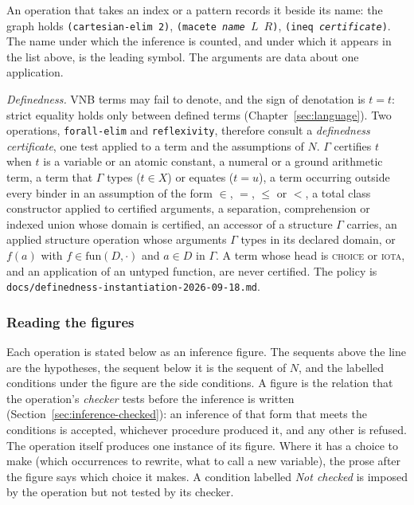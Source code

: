An operation that takes an index or a pattern records it beside its
name: the graph holds \texttt{(cartesian-elim 2)}, \texttt{(macete
\textit{name} $L$ $R$)}, \texttt{(ineq \textit{certificate})}.  The name under which the inference is counted, and under which
it appears in the list above, is the leading symbol.  The arguments are
data about one application.

\emph{Definedness.}  VNB terms may fail to denote, and the sign of
denotation is $t = t$: strict equality holds only between defined terms
(Chapter~\ref{sec:language}).  Two operations, \texttt{forall-elim}
and \texttt{reflexivity}, therefore consult a \emph{definedness
certificate}, one test applied to a term and the assumptions of $N$.
$\Gamma$ certifies $t$ when $t$ is a variable or an atomic constant, a
numeral or a ground arithmetic term, a term that $\Gamma$ types
($t \in X$) or equates ($t = u$), a term occurring outside every binder
in an assumption of the form $\in$, $=$, $\leq$ or $<$, a total class
constructor applied to certified arguments, a separation, comprehension
or indexed union whose domain is certified, an accessor of a structure
$\Gamma$ carries, an applied structure operation whose arguments
$\Gamma$ types in its declared domain, or $f(a)$ with $f \in
\mathrm{fun}(D, \cdot)$ and $a \in D$ in $\Gamma$.  A term whose head is
\textsc{choice} or \textsc{iota}, and an application of an untyped
function, are never certified.  The policy is
\texttt{docs/definedness-instantiation-2026-09-18.md}.

\subsubsection*{Reading the figures}

Each operation is stated below as an inference figure.  The sequents above
the line are the hypotheses, the sequent below it is the sequent of $N$,
and the labelled conditions under the figure are the side conditions.  A
figure is the relation that the operation's \emph{checker} tests before
the inference is written (Section~\ref{sec:inference-checked}): an
inference of that form that meets the conditions is accepted, whichever
procedure produced it, and any other is refused.  The operation itself
produces one instance of its figure.  Where it has a choice to make
(which occurrences to rewrite, what to call a new variable), the prose
after the figure says which choice it makes.  A condition labelled
\emph{Not checked} is imposed by the operation but not tested by its
checker.


